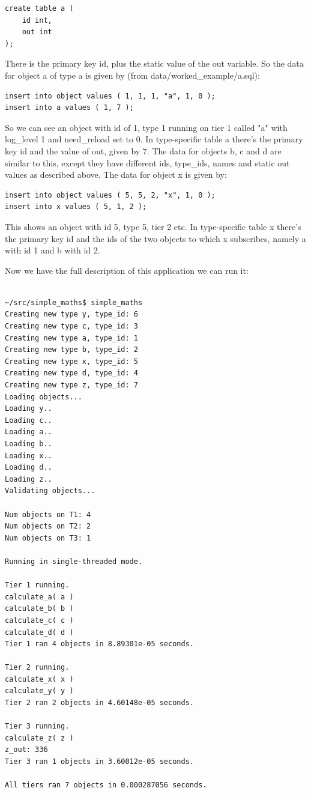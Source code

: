 \documentclass{report}
\begin{document}
\begin{verbatim}
create table a (
    id int,
    out int
);
\end{verbatim}

There is the primary key id, plus the static value of the out variable. So the data for object a of type a is given by (from data/worked_example/a.sql):

\begin{verbatim}
insert into object values ( 1, 1, 1, "a", 1, 0 );
insert into a values ( 1, 7 );
\end{verbatim}

So we can see an object with id of 1, type 1 running on tier 1 called "a" with log_level 1 and need_reload set to 0. In type-specific table a there's the primary key id and the value of out, given by 7. The data for objects b, c and d are similar to this, except they have different ids, type_ids, names and static out values as described above. The data for object x is given by:


\begin{verbatim}
insert into object values ( 5, 5, 2, "x", 1, 0 );
insert into x values ( 5, 1, 2 );
\end{verbatim}

This shows an object with id 5, type 5, tier 2 etc. In type-specific table x there's the primary key id and the ids of the two objects to which x subscribes, namely a with id 1 and b with id 2. 

Now we have the full description of this application we can run it:

\begin{verbatim}

~/src/simple_maths$ simple_maths
Creating new type y, type_id: 6
Creating new type c, type_id: 3
Creating new type a, type_id: 1
Creating new type b, type_id: 2
Creating new type x, type_id: 5
Creating new type d, type_id: 4
Creating new type z, type_id: 7
Loading objects...
Loading y..
Loading c..
Loading a..
Loading b..
Loading x..
Loading d..
Loading z..
Validating objects...

Num objects on T1: 4
Num objects on T2: 2
Num objects on T3: 1

Running in single-threaded mode.

Tier 1 running.
calculate_a( a )
calculate_b( b )
calculate_c( c )
calculate_d( d )
Tier 1 ran 4 objects in 8.89301e-05 seconds.

Tier 2 running.
calculate_x( x )
calculate_y( y )
Tier 2 ran 2 objects in 4.60148e-05 seconds.

Tier 3 running.
calculate_z( z )
z_out: 336
Tier 3 ran 1 objects in 3.60012e-05 seconds.

All tiers ran 7 objects in 0.000287056 seconds.

\end{verbatim}
\end{document}
